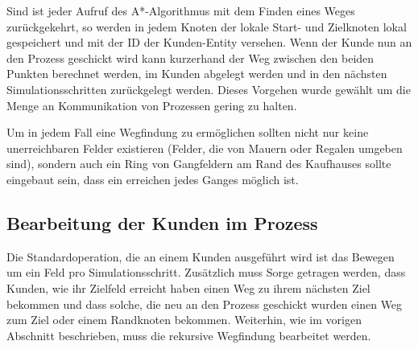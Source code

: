 Sind ist jeder Aufruf des A*-Algorithmus mit dem Finden eines Weges zurückgekehrt, so werden in jedem Knoten der lokale Start- und Zielknoten lokal gespeichert und mit der ID der Kunden-Entity versehen. Wenn der Kunde nun an den Prozess geschickt wird kann kurzerhand der Weg zwischen den beiden Punkten berechnet werden, im Kunden abgelegt werden und in den nächsten Simulationsschritten zurückgelegt werden. Dieses Vorgehen wurde gewählt um die Menge an Kommunikation von Prozessen gering zu halten.

Um in jedem Fall eine Wegfindung zu ermöglichen sollten nicht nur keine unerreichbaren Felder existieren (Felder, die von Mauern oder Regalen umgeben sind), sondern auch ein Ring von Gangfeldern am Rand des Kaufhauses  sollte eingebaut sein, dass ein erreichen jedes Ganges möglich ist.

\subsection{Bearbeitung der Kunden im Prozess}
Die Standardoperation, die an einem Kunden ausgeführt wird ist das Bewegen um ein Feld pro Simulationsschritt. Zusätzlich muss Sorge getragen werden, dass Kunden, wie ihr Zielfeld erreicht haben einen Weg zu ihrem nächsten Ziel bekommen und dass solche, die neu an den Prozess geschickt wurden einen Weg zum Ziel oder einem Randknoten bekommen. Weiterhin, wie im vorigen Abschnitt beschrieben, muss die rekursive Wegfindung bearbeitet werden.

